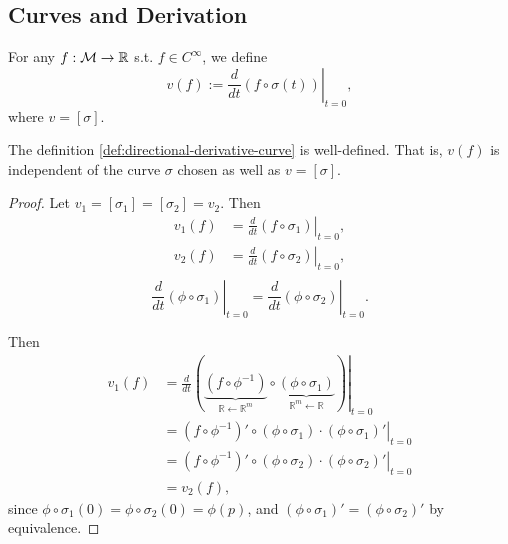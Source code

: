 \documentclass[../main.tex]{subfiles}
\begin{document}
    \subsection{Curves and Derivation}
    \begin{definition}\label{def:directional-derivative-curve}
        For any \(f : \manifold[M] \to \mathbb{R}\) s.t. \(f \in C^\infty\), we 
        define
        \[
        v(f) := \left.\frac{d}{dt}(f \circ \sigma(t))\right|_{t=0},
        \]
        where \(v = [\sigma]\).
    \end{definition}
    \begin{theorem}
        The definition \cref{def:directional-derivative-curve} is well-defined.
        That is, \(v(f)\) is independent of the curve \(\sigma\) chosen as well 
        as \(v=[\sigma]\).
    \end{theorem}
    \begin{proof}
        Let \(v_1 = [\sigma_1] = [\sigma_2] = v_2\). Then 
        \[
        \begin{aligned}
            v_1(f) &= \left.\frac{d}{dt}(f \circ \sigma_1)\right|_{t=0}, \\
            v_2(f) &= \left.\frac{d}{dt}(f \circ \sigma_2)\right|_{t=0}, \\
        \end{aligned}
        \]
        \[
        \left.\frac{d}{dt}(\phi\circ\sigma_1)\right|_{t=0}
            =\left.\frac{d}{dt}(\phi\circ\sigma_2)\right|_{t=0}.
        \] \par
        Then
        \[
        \begin{aligned}
            v_1(f) &= \left.\frac{d}{dt}
            (\underbrace{(f\circ\phi ^{-1})}_{\mathbb{R}\leftarrow \mathbb{R}^m} \circ 
            \underbrace{(\phi \circ \sigma_1)}_{\mathbb{R}^m\leftarrow \mathbb{R}})
            \right|_{t=0} \\
            &= \left.(f \circ \phi ^{-1})'\circ(\phi\circ\sigma_1)\cdot
            (\phi\circ\sigma_1)'\right|_{t=0} \\
            &= \left.(f \circ \phi ^{-1})'\circ(\phi\circ\sigma_2)\cdot
            (\phi\circ\sigma_2)'\right|_{t=0} \\
            &= v_2(f),
        \end{aligned}
        \]
        since \(\phi\circ\sigma_1(0) = \phi\circ\sigma_2(0) =\phi(p)\), and 
        \((\phi\circ\sigma_1)'=(\phi\circ\sigma_2)'\) by equivalence.
    \end{proof}
\end{document}
